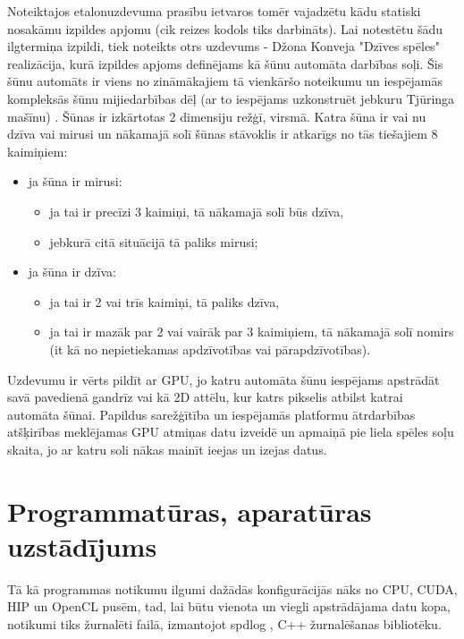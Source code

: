 Noteiktajos etalonuzdevuma prasību ietvaros tomēr vajadzētu kādu statiski
nosakāmu izpildes apjomu (cik reizes kodols tiks darbināts). Lai notestētu šādu
ilgtermiņa izpildi, tiek noteikts otrs uzdevums - Džona Konveja "Dzīves spēles"
\cite{conway1970conway} realizācija, kurā izpildes apjoms definējams kā šūnu
automāta darbības soļi. Šis šūnu automāts ir viens no zināmākajiem tā vienkāršo noteikumu un iespējamās
kompleksās šūnu mijiedarbības dēļ (ar to iespējams uzkonstruēt jebkuru Tjūringa
mašīnu) \cite{conway1970conway}. Šūnas ir izkārtotas 2 dimensiju režģī, virsmā. Katra šūna ir vai nu
dzīva vai mirusi un nākamajā solī šūnas stāvoklis ir atkarīgs no tās tiešajiem
8 kaimiņiem:
\begin{itemize}
    \item ja šūna ir mirusi:
        \begin{itemize}
            \item ja tai ir precīzi 3 kaimiņi, tā nākamajā solī būs dzīva,
            \item jebkurā citā situācijā tā paliks mirusi;
        \end{itemize}
    \item ja šūna ir dzīva:
        \begin{itemize}
            \item ja tai ir 2 vai trīs kaimiņi, tā paliks dzīva,
            \item ja tai ir mazāk par 2 vai vairāk par 3 kaimiņiem,
                tā nākamajā solī nomirs (it kā no nepietiekamas
                apdzīvotības vai pārapdzīvotības).
        \end{itemize}
\end{itemize}

Uzdevumu ir vērts pildīt ar GPU, jo katru automāta šūnu iespējams apstrādāt
savā pavedienā gandrīz vai kā 2D attēlu, kur katrs pikselis atbilst katrai
automāta šūnai. Papildus sarežģītība un iespējamās platformu ātrdarbības
atšķirības meklējamas GPU atmiņas datu izveidē un apmaiņā pie liela spēles soļu
skaita, jo ar katru soli nākas mainīt ieejas un izejas datus.


\section{Programmatūras, aparatūras uzstādījums}
Tā kā programmas notikumu ilgumi dažādās konfigurācijās nāks no CPU, CUDA, HIP
un OpenCL pusēm, tad, lai būtu vienota un viegli apstrādājama datu kopa,
notikumi tiks žurnalēti failā, izmantojot spdlog \cite{spdlog-github}, C++
žurnalēšanas bibliotēku.

